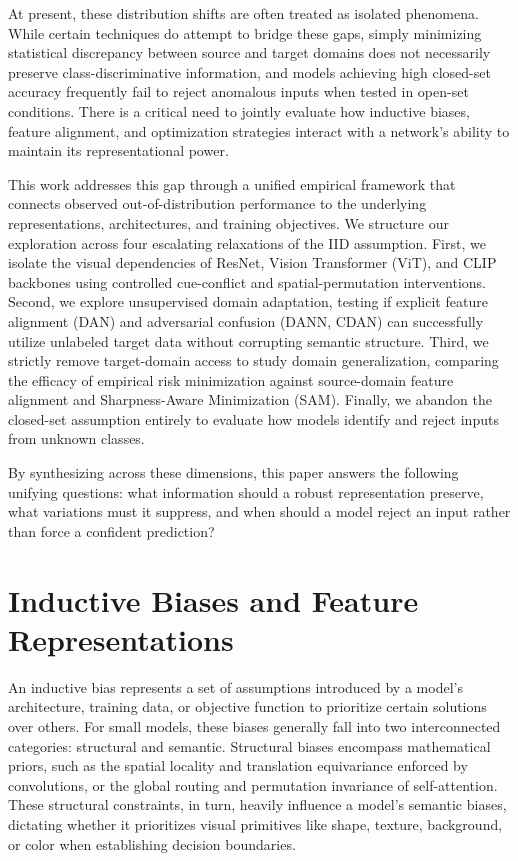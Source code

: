 \documentclass{article}
\begin{document}
At present, these distribution shifts are often treated as isolated phenomena. While certain techniques do attempt to bridge these gaps, simply minimizing statistical discrepancy between source and target domains does not necessarily preserve class-discriminative information, and models achieving high closed-set accuracy frequently fail to reject anomalous inputs when tested in open-set conditions. There is a critical need to jointly evaluate how inductive biases, feature alignment, and optimization strategies interact with a network's ability to maintain its representational power.

This work addresses this gap through a unified empirical framework that connects observed out-of-distribution performance to the underlying representations, architectures, and training objectives. We structure our exploration across four escalating relaxations of the IID assumption. First, we isolate the visual dependencies of ResNet, Vision Transformer (ViT), and CLIP backbones using controlled cue-conflict and spatial-permutation interventions. Second, we explore unsupervised domain adaptation, testing if explicit feature alignment (DAN) and adversarial confusion (DANN, CDAN) can successfully utilize unlabeled target data without corrupting semantic structure. Third, we strictly remove target-domain access to study domain generalization, comparing the efficacy of empirical risk minimization against source-domain feature alignment and Sharpness-Aware Minimization (SAM). Finally, we abandon the closed-set assumption entirely to evaluate how models identify and reject inputs from unknown classes. 

By synthesizing across these dimensions, this paper answers the following unifying questions: what information should a robust representation preserve, what variations must it suppress, and when should a model reject an input rather than force a confident prediction? 

\section{Inductive Biases and Feature Representations}
\label{section:biases}

An inductive bias represents a set of assumptions introduced by a model's architecture, training data, or objective function to prioritize certain solutions over others. For small models, these biases generally fall into two interconnected categories: structural and semantic. Structural biases encompass mathematical priors, such as the spatial locality and translation equivariance enforced by convolutions, or the global routing and permutation invariance of self-attention. These structural constraints, in turn, heavily influence a model's semantic biases, dictating whether it prioritizes visual primitives like shape, texture, background, or color when establishing decision boundaries.
\end{document}
